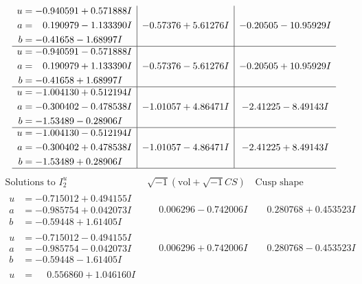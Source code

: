 \documentclass[1p]{elsarticle_modified}
\theoremstyle{definition}
\newcommand{\I}{\sqrt{-1}}
\begin{document}
$$\begin{array}{c|c|c}
\begin{aligned}
u &= -0.940591 + 0.571888 I \\
a &= \phantom{-}0.190979 - 1.133390 I \\
b &= -0.41658 - 1.68997 I\end{aligned}
 & -0.57376 + 5.61276 I & -0.20505 - 10.95929 I \\ \hline\begin{aligned}
u &= -0.940591 - 0.571888 I \\
a &= \phantom{-}0.190979 + 1.133390 I \\
b &= -0.41658 + 1.68997 I\end{aligned}
 & -0.57376 - 5.61276 I & -0.20505 + 10.95929 I \\ \hline\begin{aligned}
u &= -1.004130 + 0.512194 I \\
a &= -0.300402 - 0.478538 I \\
b &= -1.53489 - 0.28906 I\end{aligned}
 & -1.01057 + 4.86471 I & -2.41225 - 8.49143 I \\ \hline\begin{aligned}
u &= -1.004130 - 0.512194 I \\
a &= -0.300402 + 0.478538 I \\
b &= -1.53489 + 0.28906 I\end{aligned}
 & -1.01057 - 4.86471 I & -2.41225 + 8.49143 I\\
 \hline 
 \end{array}$$\newpage$$\begin{array}{c|c|c}  
\text{Solutions to }I^u_{2}& \I (\text{vol} + \sqrt{-1}CS) & \text{Cusp shape}\\
 \hline 
\begin{aligned}
u &= -0.715012 + 0.494155 I \\
a &= -0.985754 + 0.042073 I \\
b &= -0.59448 + 1.61405 I\end{aligned}
 & \phantom{-}0.006296 - 0.742006 I & \phantom{-}0.280768 + 0.453523 I \\ \hline\begin{aligned}
u &= -0.715012 - 0.494155 I \\
a &= -0.985754 - 0.042073 I \\
b &= -0.59448 - 1.61405 I\end{aligned}
 & \phantom{-}0.006296 + 0.742006 I & \phantom{-}0.280768 - 0.453523 I \\ \hline\begin{aligned}
u &= \phantom{-}0.556860 + 1.046160 I \\

\end{aligned}
\end{array}$$
\end{document}
